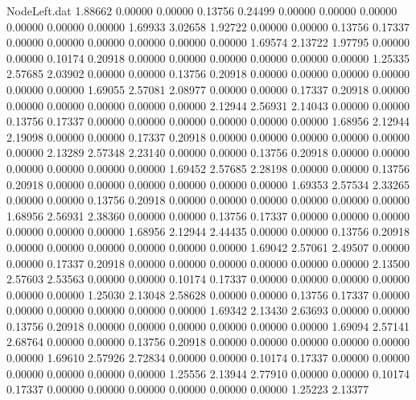 \begin{filecontents}{NodeLeft.dat}
   1.88662    0.00000    0.00000     0.13756    0.24499    0.00000    0.00000    0.00000    0.00000    0.00000    0.00000    1.69933    3.02658
   1.92722    0.00000    0.00000     0.13756    0.17337    0.00000    0.00000    0.00000    0.00000    0.00000    0.00000    1.69574    2.13722
   1.97795    0.00000    0.00000     0.10174    0.20918    0.00000    0.00000    0.00000    0.00000    0.00000    0.00000    1.25335    2.57685
   2.03902    0.00000    0.00000     0.13756    0.20918    0.00000    0.00000    0.00000    0.00000    0.00000    0.00000    1.69055    2.57081
   2.08977    0.00000    0.00000     0.17337    0.20918    0.00000    0.00000    0.00000    0.00000    0.00000    0.00000    2.12944    2.56931
   2.14043    0.00000    0.00000     0.13756    0.17337    0.00000    0.00000    0.00000    0.00000    0.00000    0.00000    1.68956    2.12944
   2.19098    0.00000    0.00000     0.17337    0.20918    0.00000    0.00000    0.00000    0.00000    0.00000    0.00000    2.13289    2.57348
   2.23140    0.00000    0.00000     0.13756    0.20918    0.00000    0.00000    0.00000    0.00000    0.00000    0.00000    1.69452    2.57685
   2.28198    0.00000    0.00000     0.13756    0.20918    0.00000    0.00000    0.00000    0.00000    0.00000    0.00000    1.69353    2.57534
   2.33265    0.00000    0.00000     0.13756    0.20918    0.00000    0.00000    0.00000    0.00000    0.00000    0.00000    1.68956    2.56931
   2.38360    0.00000    0.00000     0.13756    0.17337    0.00000    0.00000    0.00000    0.00000    0.00000    0.00000    1.68956    2.12944
   2.44435    0.00000    0.00000     0.13756    0.20918    0.00000    0.00000    0.00000    0.00000    0.00000    0.00000    1.69042    2.57061
   2.49507    0.00000    0.00000     0.17337    0.20918    0.00000    0.00000    0.00000    0.00000    0.00000    0.00000    2.13500    2.57603
   2.53563    0.00000    0.00000     0.10174    0.17337    0.00000    0.00000    0.00000    0.00000    0.00000    0.00000    1.25030    2.13048
   2.58628    0.00000    0.00000     0.13756    0.17337    0.00000    0.00000    0.00000    0.00000    0.00000    0.00000    1.69342    2.13430
   2.63693    0.00000    0.00000     0.13756    0.20918    0.00000    0.00000    0.00000    0.00000    0.00000    0.00000    1.69094    2.57141
   2.68764    0.00000    0.00000     0.13756    0.20918    0.00000    0.00000    0.00000    0.00000    0.00000    0.00000    1.69610    2.57926
   2.72834    0.00000    0.00000     0.10174    0.17337    0.00000    0.00000    0.00000    0.00000    0.00000    0.00000    1.25556    2.13944
   2.77910    0.00000    0.00000     0.10174    0.17337    0.00000    0.00000    0.00000    0.00000    0.00000    0.00000    1.25223    2.13377

\end{filecontents}
